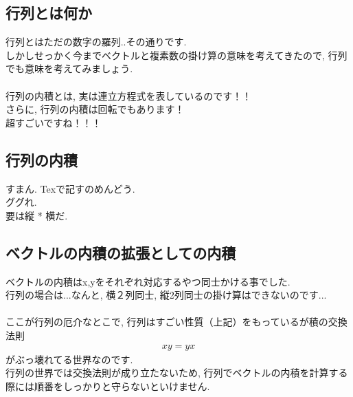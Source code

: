 \documentclass[11pt,a4paper]{jreport}
\begin{document}
\subsection{行列とは何か}
行列とはただの数字の羅列..その通りです.\\
しかしせっかく今までベクトルと複素数の掛け算の意味を考えてきたので, 行列でも意味を考えてみましょう.\\
\\
行列の内積とは, 実は連立方程式を表しているのです！！\\
さらに, 行列の内積は回転でもあります！\\
超すごいですね！！！\\
\subsection{行列の内積}
すまん. Texで記すのめんどう. 
\\
ググれ.
\\
要は縦 * 横だ.\\

\subsection{ベクトルの内積の拡張としての内積}
ベクトルの内積はx,yをそれぞれ対応するやつ同士かける事でした.\\
行列の場合は...なんと, 横２列同士, 縦2列同士の掛け算はできないのです...\\
\\
ここが行列の厄介なとこで, 行列はすごい性質（上記）をもっているが積の交換法則
\begin{eqnarray}
xy = yx
\end{eqnarray}
がぶっ壊れてる世界なのです. \\
行列の世界では交換法則が成り立たないため, 行列でベクトルの内積を計算する際には順番をしっかりと守らないといけません.\\
\end{document}
